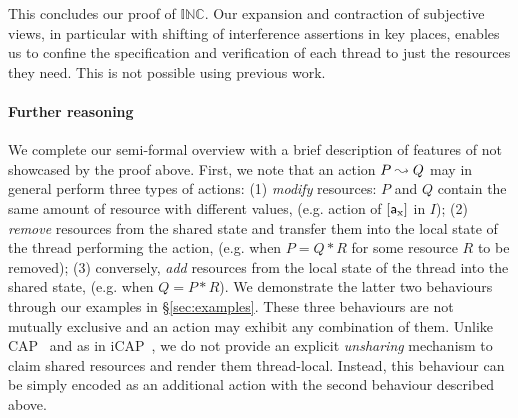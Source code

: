 This concludes our \colosl proof of $\mathbb{INC}$. Our expansion and contraction of subjective
views, in particular with shifting of interference assertions in key places, enables us to confine the specification and verification of each thread to just the resources they need. This  is not possible using previous work.
%
\paragraph{\textbf{Further \colosl reasoning}}
We complete our semi-formal overview with a brief description of features of \colosl not
showcased by the proof above. First, we note that an action $P\mathrel{\leadsto} Q$
may in general perform three types of actions: (1)
  \emph{modify} resources: $P$ and $Q$ contain the same amount of
  resource with different values, (e.g. action of $[\mathsf{a}_{\text{x}}]$ in $I$);
  (2)
  \emph{remove} resources from the shared state and transfer them into
  the local state of the thread performing the action, (e.g. when $P = Q * R$ for some resource $R$ to be removed);
  (3)
  conversely, \emph{add} resources from the local state of the thread
  into the shared state, (e.g. when $Q = P * R$).
We demonstrate the latter two behaviours through our examples in
\S\ref{sec:examples}. These three behaviours are not mutually
exclusive and an action may exhibit any combination of them.  Unlike
CAP~\cite{cap-ecoop10} and as in iCAP~\cite{icap}, we do not provide
an explicit \emph{unsharing} mechanism to claim shared
resources and render them thread-local. Instead, this behaviour can
be simply encoded as an additional action with the second behaviour
described above.
%




